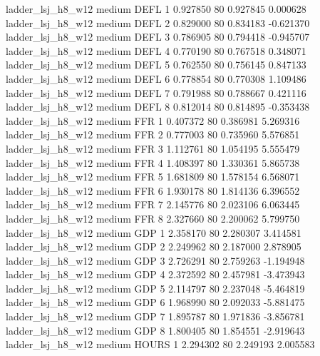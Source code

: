   ladder_lsj_h8_w12     medium     DEFL                 1  0.927850 80       0.927845           0.000628
  ladder_lsj_h8_w12     medium     DEFL                 2  0.829000 80       0.834183          -0.621370
  ladder_lsj_h8_w12     medium     DEFL                 3  0.786905 80       0.794418          -0.945707
  ladder_lsj_h8_w12     medium     DEFL                 4  0.770190 80       0.767518           0.348071
  ladder_lsj_h8_w12     medium     DEFL                 5  0.762550 80       0.756145           0.847133
  ladder_lsj_h8_w12     medium     DEFL                 6  0.778854 80       0.770308           1.109486
  ladder_lsj_h8_w12     medium     DEFL                 7  0.791988 80       0.788667           0.421116
  ladder_lsj_h8_w12     medium     DEFL                 8  0.812014 80       0.814895          -0.353438
  ladder_lsj_h8_w12     medium      FFR                 1  0.407372 80       0.386981           5.269316
  ladder_lsj_h8_w12     medium      FFR                 2  0.777003 80       0.735960           5.576851
  ladder_lsj_h8_w12     medium      FFR                 3  1.112761 80       1.054195           5.555479
  ladder_lsj_h8_w12     medium      FFR                 4  1.408397 80       1.330361           5.865738
  ladder_lsj_h8_w12     medium      FFR                 5  1.681809 80       1.578154           6.568071
  ladder_lsj_h8_w12     medium      FFR                 6  1.930178 80       1.814136           6.396552
  ladder_lsj_h8_w12     medium      FFR                 7  2.145776 80       2.023106           6.063445
  ladder_lsj_h8_w12     medium      FFR                 8  2.327660 80       2.200062           5.799750
  ladder_lsj_h8_w12     medium      GDP                 1  2.358170 80       2.280307           3.414581
  ladder_lsj_h8_w12     medium      GDP                 2  2.249962 80       2.187000           2.878905
  ladder_lsj_h8_w12     medium      GDP                 3  2.726291 80       2.759263          -1.194948
  ladder_lsj_h8_w12     medium      GDP                 4  2.372592 80       2.457981          -3.473943
  ladder_lsj_h8_w12     medium      GDP                 5  2.114797 80       2.237048          -5.464819
  ladder_lsj_h8_w12     medium      GDP                 6  1.968990 80       2.092033          -5.881475
  ladder_lsj_h8_w12     medium      GDP                 7  1.895787 80       1.971836          -3.856781
  ladder_lsj_h8_w12     medium      GDP                 8  1.800405 80       1.854551          -2.919643
  ladder_lsj_h8_w12     medium    HOURS                 1  2.294302 80       2.249193           2.005583
